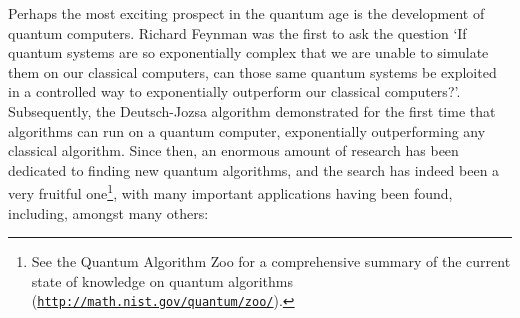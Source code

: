 \documentclass[aps, rmp, twocolumn, amsmath, amssymb, nofootinbib, superscriptaddress, longbibliography, floatfix, table-of-contents, eqsecnum]{revtex4-1}
\begin{document}
Perhaps the most exciting prospect in the quantum age is the development of quantum computers. Richard Feynman \cite{bib:Feynman85} was the first to ask the question `If quantum systems are so exponentially complex that we are unable to simulate them on our classical computers, can those same quantum systems be exploited in a controlled way to exponentially outperform our classical computers?'. Subsequently, the Deutsch-Jozsa algorithm \cite{bib:DeutschJozsa92} demonstrated for the first time that algorithms can run on a quantum computer, exponentially outperforming any classical algorithm. Since then, an enormous amount of research has been dedicated to finding new quantum algorithms, and the search has indeed been a very fruitful one\footnote{See the Quantum Algorithm Zoo for a comprehensive summary of the current state of knowledge on quantum algorithms (\texttt{\href{http://math.nist.gov/quantum/zoo/}{http://math.nist.gov/quantum/zoo/}}).}, with many important applications having been found, including, amongst many others:
\end{document}
